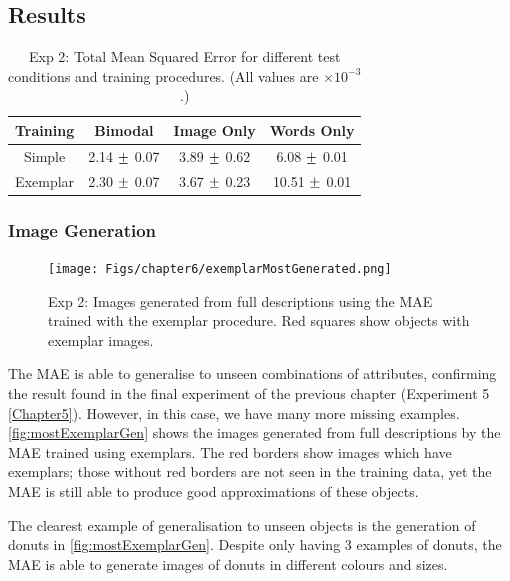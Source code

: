 \subsection{Results}

\begin{table}[h!]
\centering
	\begin{tabular}{|c|c|c|c|}
	\hline
\textbf{Training} & 	\textbf{Bimodal} & 	\textbf{Image Only} 	& 	\textbf{Words Only} \\ \hline
Simple &  2.14 $\mypm$	0.07 & 3.89 $\mypm$	0.62 & 6.08 $\mypm$ 0.01 \\ \hline
Exemplar & 2.30 $\mypm$ 0.07 & 3.67 $\mypm$ 0.23
& 10.51	$\mypm$ 0.01 \\ \hline

\end{tabular}
\caption{Exp 2: Total Mean Squared Error for different test conditions and training procedures. (All values are $\times10^{-3}$.)}
\label{tab:6_res_exp2}
\end{table}


\subsubsection{Image Generation}
\begin{figure}[ht]
    \centering
    \texttt{[image: Figs/chapter6/exemplarMostGenerated.png]}
    \caption{Exp 2: Images generated from full descriptions using the MAE trained with the exemplar procedure. Red squares show objects with exemplar images.}
    \label{fig:mostExemplarGen}
\end{figure}

The MAE is able to generalise to unseen combinations of attributes, confirming the result found in the final experiment of the previous chapter (Experiment 5 \autoref{Chapter5}). However, in this case, we have many more missing examples. \autoref{fig:mostExemplarGen} shows the images generated from full descriptions by the MAE trained using exemplars. The red borders show images which have exemplars; those without red borders are not seen in the training data, yet the MAE is still able to produce good approximations of these objects.

The clearest example of generalisation to unseen objects is the generation of donuts in \autoref{fig:mostExemplarGen}. Despite only having 3 examples of donuts, the MAE is able to generate images of donuts in different colours and sizes.  

